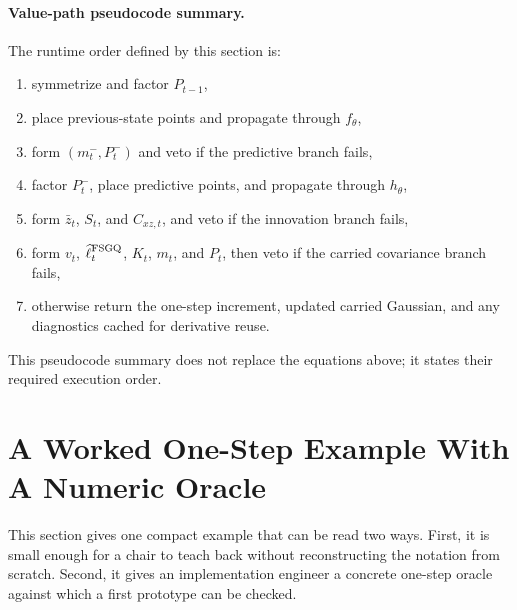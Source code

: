 \documentclass[11pt]{article}
\numberwithin{equation}{section}
\newcommand{\ellhat}{\widehat\ell}
\begin{document}
\paragraph{Value-path pseudocode summary.}
The runtime order defined by this section is:
\begin{enumerate}[leftmargin=0.28in]
  \item symmetrize and factor \(P_{t-1}\),
  \item place previous-state points and propagate through \(f_\theta\),
  \item form \((m_t^-,P_t^-)\) and veto if the predictive branch fails,
  \item factor \(P_t^-\), place predictive points, and propagate through
  \(h_\theta\),
  \item form \(\bar z_t\), \(S_t\), and \(C_{xz,t}\), and veto if the
  innovation branch fails,
  \item form \(v_t\), \(\ellhat_t^{\rm FSGQ}\), \(K_t\), \(m_t\), and \(P_t\),
  then veto if the carried covariance branch fails,
  \item otherwise return the one-step increment, updated carried Gaussian, and
  any diagnostics cached for derivative reuse.
\end{enumerate}
This pseudocode summary does not replace the equations above; it states their
required execution order.

\section{A Worked One-Step Example With A Numeric Oracle}
\label{sec:p32-worked-example}

This section gives one compact example that can be read two ways.  First, it is
small enough for a chair to teach back without reconstructing the notation from
scratch.  Second, it gives an implementation engineer a concrete one-step oracle
against which a first prototype can be checked.
\end{document}
